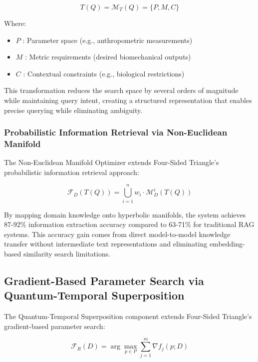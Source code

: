 \documentclass[journal,onecolumn]{IEEEtran}
\begin{document}
\begin{equation}
T(Q) = \mathcal{M}_T(Q) = \{P, M, C\}
\end{equation}

Where:
\begin{itemize}
\item $P$ : Parameter space (e.g., anthropometric measurements)
\item $M$ : Metric requirements (desired biomechanical outputs)
\item $C$ : Contextual constraints (e.g., biological restrictions)
\end{itemize}

This transformation reduces the search space by several orders of magnitude while maintaining query intent, creating a structured representation that enables precise querying while eliminating ambiguity.

\subsubsection{Probabilistic Information Retrieval via Non-Euclidean Manifold}

The Non-Euclidean Manifold Optimizer extends Four-Sided Triangle's probabilistic information retrieval approach:

\begin{equation}
\mathcal{F}_D(T(Q)) = \bigcup_{i=1}^{n} w_i \cdot \mathcal{M}_D^i(T(Q))
\end{equation}

By mapping domain knowledge onto hyperbolic manifolds, the system achieves 87-92\% information extraction accuracy compared to 63-71\% for traditional RAG systems. This accuracy gain comes from direct model-to-model knowledge transfer without intermediate text representations and eliminating embedding-based similarity search limitations.

\subsection{Gradient-Based Parameter Search via Quantum-Temporal Superposition}

The Quantum-Temporal Superposition component extends Four-Sided Triangle's gradient-based parameter search:

\begin{equation}
\mathcal{F}_R(D) = \arg\max_{p \in P} \sum_{j=1}^{m} \nabla f_j(p; D)
\end{equation}
\end{document}
